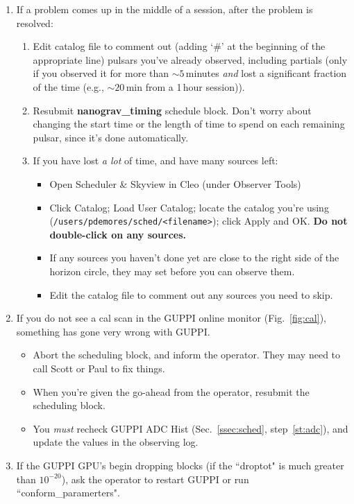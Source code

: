 \documentclass[11pt, reqno, tbtags]{article}
\begin{document}
\begin{enumerate}
 \item If a problem comes up in the middle of a session, after the problem is resolved: \begin{enumerate}
  \item Edit catalog file to comment out (adding `\#' at the beginning of the appropriate line) pulsars you've already observed, including partials (only if you observed it for more than $\sim5$\,minutes \textit{and} lost a significant fraction of the time (e.g., $\sim20$\,min from a 1\,hour session)). 
  \item Resubmit \textbf{nanograv\_timing} schedule block.  Don't worry about changing the start time or the length of time to spend on each remaining pulsar, since it's done automatically.  
  \item\label{st:time} If you have lost \textit{a lot} of time, and have many sources left: \begin{itemize}
   \item Open Scheduler \& Skyview in Cleo (under Observer Tools)
   \item Click Catalog; Load User Catalog; locate the catalog you're using \\
   (\texttt{/users/pdemores/sched/<filename>}); click Apply and OK. 
   \textbf{Do not double-click on any sources.} 
   \item If any sources you haven't done yet are close to the right side of the horizon circle, they may set before you can observe them.  
   \item Edit the catalog file to comment out any sources you need to skip.  
  \end{itemize}
 \end{enumerate}

 \item\label{st:monp} If you do not see a cal scan in the GUPPI online monitor (Fig.~\ref{fig:cal}), something has gone very wrong with GUPPI.  \begin{itemize}
  \item Abort the scheduling block, and inform the operator.  They may need to call Scott or Paul to fix things.  
  \item When you're given the go-ahead from the operator, resubmit the scheduling block.  
  \item You \textit{must} recheck GUPPI ADC Hist (Sec.~\ref{ssec:sched}, step~\ref{st:adc}), and update the values in the observing log.  
 \end{itemize}

 \item If the GUPPI GPU's begin dropping blocks (if the ``droptot" is much greater than $10^{-20}$), ask the operator to restart GUPPI or run ``conform\_paramerters".  


\end{enumerate}
\end{document}
